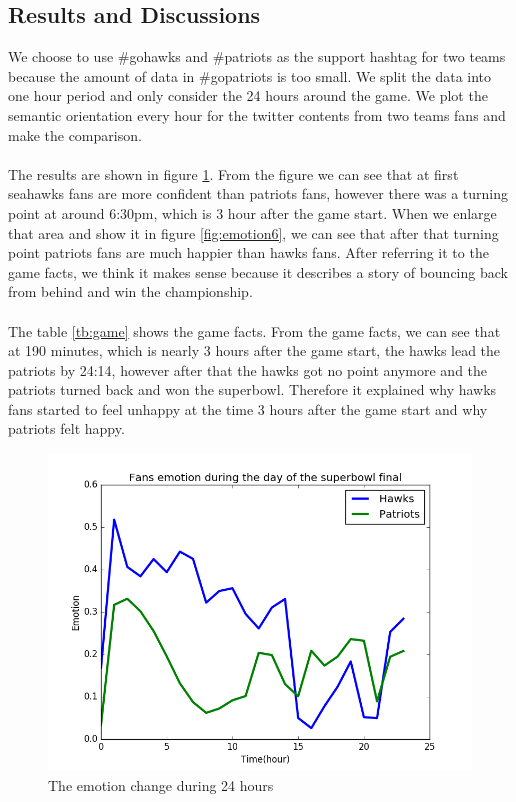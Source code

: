 \documentclass{article}
\begin{document}
\subsection{Results and Discussions}
We choose to use \#gohawks and \#patriots as the support hashtag for two teams because the amount of data in \#gopatriots is too small. We split the data into one hour period and only consider the 24 hours around the game. We plot the semantic orientation every hour for the twitter contents from two teams fans and make the comparison. \\
\\
The results are shown in figure \ref{fig:emotion24}. From the figure we can see that at first seahawks fans are more confident than patriots fans, however there was a turning point at around  6:30pm, which is 3 hour after the game start. When we enlarge that area and show it in figure \ref{fig:emotion6}, we can see that after that turning point patriots fans are much happier than hawks fans. After referring it to the game facts, we think it makes sense because it describes a story of bouncing back from behind and win the championship. \\
\\
The table \ref{tb:game} shows the game facts. From the game facts, we can see that at 190 minutes, which is nearly 3 hours after the game start, the hawks lead the patriots by 24:14, however after that the hawks got no point anymore and the patriots turned back and won the superbowl. Therefore it explained why hawks fans started to feel unhappy at the time 3 hours after the game start and why patriots felt happy.
\begin{figure}[htbp]
\centering
\includegraphics[width=.6\textwidth]{emotion24.png}
\caption{The emotion change during 24 hours}
\label{fig:emotion24}
\end{figure}
\end{document}
